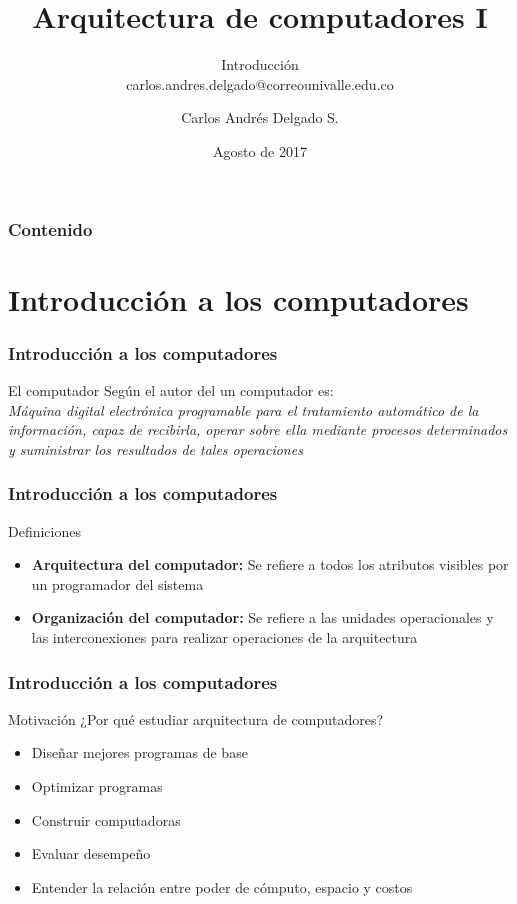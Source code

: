 \documentclass{beamer}
\author{Carlos Andr\'es Delgado S.}
\title{Arquitectura de computadores I }
\subtitle{Introducción \\ carlos.andres.delgado@correounivalle.edu.co}
\institute{Facultad de Ingeniería. Universidad del Valle}
\date{Agosto de 2017}
\begin{document}
	\begin{frame}
		\titlepage	 		
	\end{frame}
	\begin{frame}
 		\frametitle{Contenido}
		\tableofcontents
	\end{frame}
	


\section{Introducción a los computadores}

	\begin{frame}
 		\frametitle{Introducción a los computadores}
		\begin{block}{El computador}
		Según el autor del \cite{stallings} un computador es: \\
		\textit{Máquina digital electrónica programable para el tratamiento automático de la información, capaz de recibirla, operar sobre ella mediante procesos determinados y suministrar los resultados de tales operaciones}
		\end{block}
	\end{frame}

	\begin{frame}
 		\frametitle{Introducción a los computadores}
		\begin{block}{Definiciones}
		\begin{itemize}
			\item \textbf{Arquitectura del computador:} Se refiere a todos los atributos visibles por un programador del sistema
			\item \textbf{Organización del computador:} Se refiere a las unidades operacionales y las interconexiones para realizar operaciones de la arquitectura
		\end{itemize}
		\end{block}
	\end{frame}
	\begin{frame}
 		\frametitle{Introducción a los computadores}
		\begin{block}{Motivación}
		¿Por qué estudiar arquitectura de computadores?
		\begin{itemize}
			\item Diseñar mejores programas de base
			\item Optimizar programas
			\item Construir computadoras
			\item Evaluar desempeño
			\item Entender la relación entre poder de cómputo, espacio y costos
		\end{itemize}
		\end{block}
	\end{frame}
\end{document}
